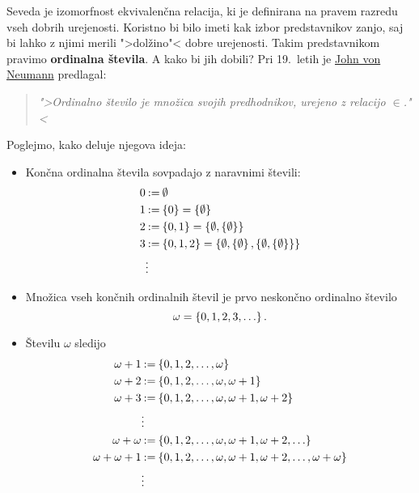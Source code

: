 Seveda je izomorfnost ekvivalenčna relacija, ki je definirana na pravem razredu vseh dobrih urejenosti. 
Koristno bi bilo imeti kak izbor predstavnikov zanjo, saj bi lahko z njimi merili ">dolžino"< dobre urejenosti. Takim predstavnikom pravimo \textbf{ordinalna števila}. A kako bi jih dobili? Pri 19.~letih je \href{https://en.wikipedia.org/wiki/John_von_Neumann}{John von Neumann} predlagal:
%
\begin{quote}
  \emph{">Ordinalno število je množica svojih predhodnikov, urejeno z relacijo $\in$."<}
\end{quote}
%
Poglejmo, kako deluje njegova ideja:
%
\begin{itemize}

\item Končna ordinalna števila sovpadajo z naravnimi števili:
  \begin{align*}
    0 &\mathbin{{:}{=}} \emptyset \\
    1 &\mathbin{{:}{=}} \left\{0\right\} = \left\{\emptyset\right\} \\
    2 &\mathbin{{:}{=}} \left\{0, 1\right\} = \left\{\emptyset, \left\{\emptyset\right\}\right\} \\
    3 &\mathbin{{:}{=}} \left\{0, 1, 2\right\} = \left\{\emptyset, \left\{\emptyset\right\}, \left\{\emptyset, \left\{\emptyset\right\}\right\}\right\} \\
      &\vdots
  \end{align*}

\item Množica vseh končnih ordinalnih števil je prvo neskončno ordinalno število
  \begin{equation*}
    \omega = \left\{0, 1, 2, 3, \ldots\right\}.
  \end{equation*}

\item Številu $\omega$ sledijo
  \begin{align*}
    \omega + 1 &\mathbin{{:}{=}} \left\{0, 1, 2, \ldots, \omega\right\} \\
    \omega + 2 &\mathbin{{:}{=}} \left\{0, 1, 2, \ldots, \omega, \omega + 1\right\} \\
    \omega + 3 &\mathbin{{:}{=}} \left\{0, 1, 2, \ldots, \omega, \omega + 1, \omega + 2\right\} \\
               &\vdots \\
    \omega + \omega &\mathbin{{:}{=}} \left\{0, 1, 2, \ldots, \omega, \omega + 1, \omega + 2, \ldots\right\} \\
    \omega + \omega + 1 &\mathbin{{:}{=}} \left\{0, 1, 2, \ldots, \omega, \omega + 1, \omega + 2, \ldots, \omega + \omega\right\} \\
               &\vdots
  \end{align*}
\end{itemize}

